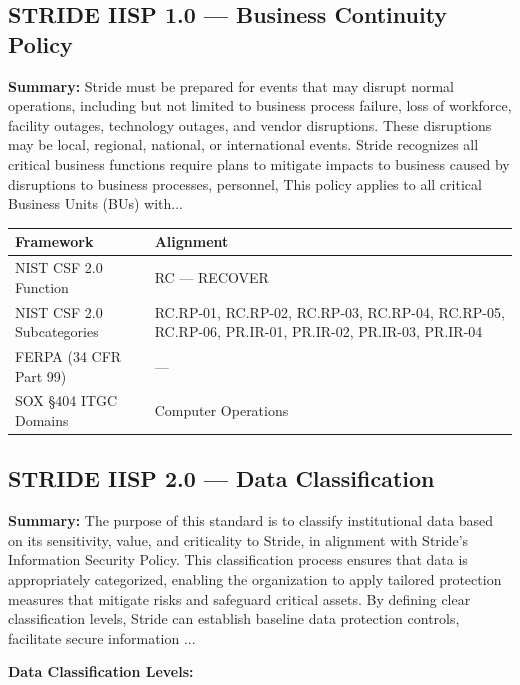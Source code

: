 \documentclass[11pt,landscape]{article}
\begin{document}
\subsection{\textcolor{strideblue}{STRIDE IISP 1.0} --- Business Continuity Policy}
\label{pol:IISP10}

\textbf{Summary:} Stride must be prepared for events that may disrupt normal operations, including but not limited to business process failure, loss of workforce, facility outages, technology outages, and vendor disruptions. These disruptions may be local, regional, national, or international events. Stride recognizes all critical business functions require plans to mitigate impacts to business caused by disruptions to business processes, personnel, This policy applies to all critical Business Units (BUs) with...

\begin{tabularx}{\textwidth}{|p{4cm}|X|}
\hline
\rowcolor{headgray} \textbf{Framework} & \textbf{Alignment} \\
\hline
NIST CSF 2.0 Function & RC --- RECOVER \\
\hline
NIST CSF 2.0 Subcategories & RC.RP-01, RC.RP-02, RC.RP-03, RC.RP-04, RC.RP-05, RC.RP-06, PR.IR-01, PR.IR-02, PR.IR-03, PR.IR-04 \\
\hline
FERPA (34 CFR Part 99) & --- \\
\hline
SOX §404 ITGC Domains & Computer Operations \\
\hline
\end{tabularx}


\subsection{\textcolor{strideblue}{STRIDE IISP 2.0} --- Data Classification}
\label{pol:IISP20}

\textbf{Summary:} The purpose of this standard is to classify institutional data based on its sensitivity, value, and criticality to Stride, in alignment with Stride’s Information Security Policy. This classification process ensures that data is appropriately categorized, enabling the organization to apply tailored protection measures that mitigate risks and safeguard critical assets. By defining clear classification levels, Stride can establish baseline data protection controls, facilitate secure information ...

\textbf{Data Classification Levels:}
\end{document}
